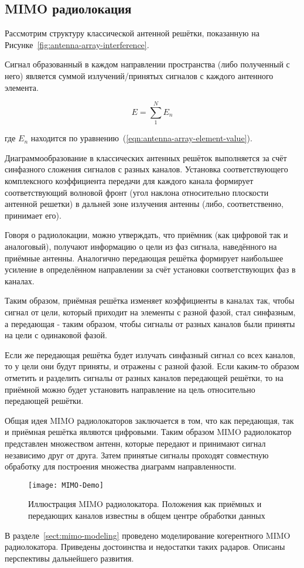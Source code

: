 \subsection{MIMO радиолокация}\label{sect:mimo-theory}

Рассмотрим структуру классической антенной решётки, показанную на Рисунке~\ref{fig:antenna-array-interference}. 

Сигнал образованный в каждом направлении пространства (либо полученный с него) является суммой 
излучений/принятых сигналов с каждого антенного элемента.

\begin{equation*}
    E=\sum_{1}^{N} E_n
\end{equation*}

\noindent где $E_n$ находится по уравнению~(\ref{eqn:antenna-array-element-value}).

Диаграммообразование в классических антенных решёток выполняется за счёт синфазного сложения сигналов с разных каналов. 
Установка соответствующего комплексного коэффициента передачи для каждого канала формирует соответствующий волновой фронт 
(угол наклона относительно плоскости антенной решетки) в дальней зоне излучения антенны (либо, соответственно, принимает его). 

Говоря о радиолокации, можно утверждать, что приёмник (как цифровой так и аналоговый), получают информацию о цели из 
фаз сигнала, наведённого на приёмные антенны. Аналогично передающая решётка формирует наибольшее усиление в 
определённом направлении за счёт установки соответствующих фаз в каналах. 

Таким образом, приёмная решётка изменяет коэффициенты в каналах так, чтобы сигнал от цели, который приходит на элементы 
с разной фазой, стал синфазным, а передающая - таким образом, чтобы сигналы от разных каналов 
были приняты на цели с одинаковой фазой. 

Если же передающая решётка будет излучать синфазный сигнал со всех каналов, то у цели они будут приняты, 
и отражены с разной фазой. Если каким-то образом отметить и разделить сигналы от разных каналов передающей решётки, 
то на приёмной можно будет установить направление на цель относительно передающей решётки. 

Общая идея MIMO радиолокаторов заключается в том, что как передающая, так и приёмная решётка являются цифровыми.
Таким образом MIMO радиолокатор представлен множеством антенн, 
которые передают и принимают сигнал независимо друг от друга. 
Затем принятые сигналы проходят совместную обработку для построения множества диаграмм направленности.

\begin{figure}[H]
    \centering
    \texttt{[image: MIMO-Demo]}
    \caption{Иллюстрация MIMO радиолокатора. Положения как приёмных и передающих каналов известны в общем центре обработки данных}%
    \label{fig:mimo-demo}
\end{figure}

В разделе~\ref{sect:mimo-modeling} проведено моделирование когерентного MIMO радиолокатора. 
Приведены достоинства и недостатки таких радаров. Описаны перспективы дальнейшего развития.

